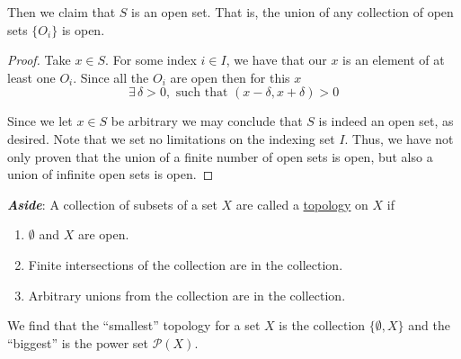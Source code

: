 \documentclass[12pt]{article}
\newlength\tindent
\renewcommand{\indent}{\hspace*{\tindent}}
\begin{document}
\indent Then we claim that $S$ is an open set. That is, the union of any collection of open sets $\{O_i\}$ is open.

\begin{proof} Take $x \in S$. For some index $i \in I$, we have that our $x$ is an element of at least one $O_i$. Since all the $O_i$ are open then for this $x$
\begin{equation*}
	\exists\,\delta > 0, \text{ such that } (x - \delta, x + \delta) > 0
\end{equation*}

\indent Since we let $x \in S$ be arbitrary we may conclude that $S$ is indeed an open set, as desired. Note that we set no limitations on the indexing set $I$. Thus, we have not only proven that the union of a finite number of open sets is open, but also a union of infinite open sets is open.
\end{proof}

%
% 
{\bf \em Aside}: A collection of subsets of a set $X$ are called a \underline{topology} on $X$ if
\begin{enumerate}
	\item $\emptyset$ and $X$ are open.
	\item Finite intersections of the collection are in the collection.
	\item Arbitrary unions from the collection are in the collection.
\end{enumerate}

\indent We find that the ``smallest'' topology for a set $X$ is the collection $\{\emptyset,X\}$ and the ``biggest'' is the power set $\mathcal P(X)$.
\end{document}
